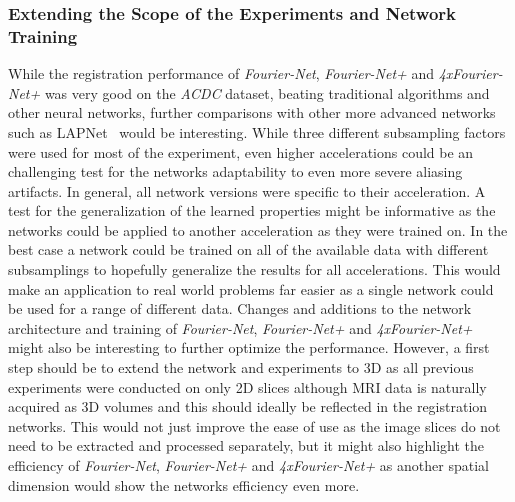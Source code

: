 \subsubsection{Extending the Scope of the Experiments and Network Training} \label{SubSubSec:ExtendingScopeExperimentsNetworkTraining}
While the registration performance of \emph{Fourier-Net}, \emph{Fourier-Net+} and \emph{4xFourier-Net+} was very good on the \emph{ACDC} dataset, beating traditional algorithms and other neural networks, further comparisons with other more advanced networks such as LAPNet~\cite{LAPNet} would be interesting. While three different subsampling factors were used for most of the experiment, even higher accelerations could be an challenging test for the networks adaptability to even more severe aliasing artifacts. In general, all network versions were specific to their acceleration. A test for the generalization of the learned properties might be informative as the networks could be applied to another acceleration as they were trained on. In the best case a network could be trained on all of the available data with different subsamplings to hopefully generalize the results for all accelerations. This would make an application to real world problems far easier as a single network could be used for a range of different data. Changes and additions to the network architecture and training of \emph{Fourier-Net}, \emph{Fourier-Net+} and \emph{4xFourier-Net+} might also be interesting to further optimize the performance. However, a first step should be to extend the network and experiments to 3D as all previous experiments were conducted on only 2D slices although MRI data is naturally acquired as 3D volumes and this should ideally be reflected in the registration networks. This would not just improve the ease of use as the image slices do not need to be extracted and processed separately, but it might also highlight the efficiency of \emph{Fourier-Net}, \emph{Fourier-Net+} and \emph{4xFourier-Net+} as another spatial dimension would show the networks efficiency even more.

